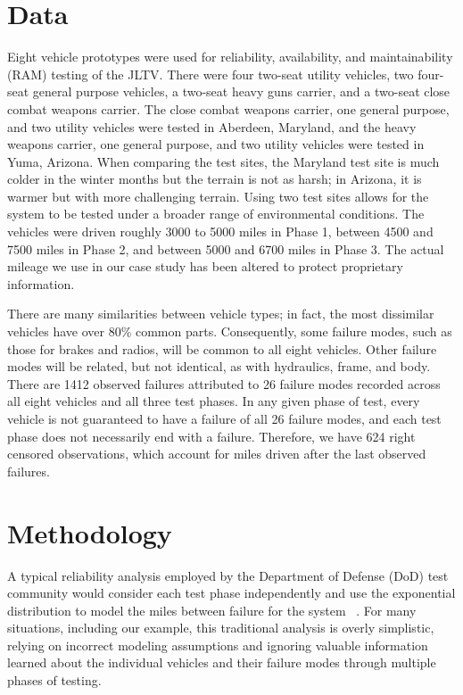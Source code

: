 \documentclass[12pt]{article}
\begin{document}
\section{Data}
Eight vehicle prototypes were used for reliability, availability, and maintainability (RAM) testing of the JLTV. There were four two-seat utility vehicles,
two four-seat general purpose vehicles, a two-seat heavy guns carrier, and a
two-seat close combat weapons carrier. The close combat weapons carrier, one
general purpose, and two utility vehicles were tested in Aberdeen, Maryland, and the heavy weapons carrier, one general purpose, and two utility vehicles
were tested in Yuma, Arizona. When comparing the test sites, the Maryland test site is much colder in the winter months but the terrain is not as harsh; in Arizona, it is warmer but with more challenging terrain. Using two test sites allows for the system to be tested under a broader range of environmental conditions.
The vehicles were driven roughly 3000 to 5000 miles in Phase 1, between
4500 and 7500 miles in Phase 2, and between 5000 and 6700 miles in Phase
3. The actual mileage we use in our case study has been altered to protect proprietary information.

There are many similarities between vehicle types; in fact, the most dissimilar
vehicles have over 80\% common parts. Consequently, some failure modes, such as those for
brakes and radios, will be common to all eight vehicles. Other failure modes
will be related, but not identical, as with hydraulics, frame, and body. There are 1412 observed failures attributed to 26 failure modes recorded across
all eight vehicles and all three test phases. In any given phase of test, every
vehicle is not guaranteed to have a failure of all 26 failure modes, and each
test phase does not necessarily end with a failure. Therefore, we have 624 right
censored observations, which account for miles driven after the last observed failures.

\section{Methodology}
A typical reliability analysis employed by the Department of Defense (DoD) test
community would consider each test phase independently and use the exponential
distribution to model the miles between failure for the system ~\cite{ref1}. For many situations, including our example, this
traditional analysis is overly simplistic, relying on incorrect modeling assumptions and ignoring valuable information learned about the individual vehicles and their failure modes through multiple phases of testing.
\end{document}
